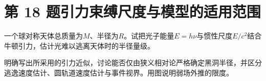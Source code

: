 \documentclass[UTF8,fontset=fandol,a4paper,11pt]{ctexart}
\begin{document}


\section*{第 18 题\quad 引力束缚尺度与模型的适用范围}\label{q:18}

一个球对称天体总质量为$M$、半径为$R$。试把光子能量$E=h\nu$与惯性尺度$E/c^2$结合牛顿引力，估计光难以逃离天体时的半径量级。

明确写出所采用的引力近似，讨论能否仅由狭义相对论严格确定黑洞半径，并区分逃逸速度估计、圆轨道速度估计与事件视界。用图说明弱场外推的限度。

\begin{center}\begin{minipage}{.98\linewidth}\centering
\begin{tikzpicture}[scale=.9,transform shape]

\end{tikzpicture}
\end{minipage}
\end{center}
\end{document}
